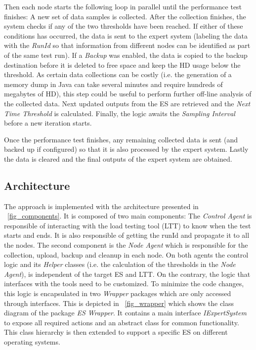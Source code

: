 \documentclass[runningheads,a4paper]{llncs}
\begin{document}

Then each node starts the following loop in parallel until the performance test
finishes: A new set of data samples is collected. After the collection finishes,
the system checks if any of the two thresholds have been reached. If either of
these conditions has occurred, the data is sent to the expert system (labeling the 
data with the \emph{RunId} so that information from different nodes can be
identified as part of the same test run). If a \emph{Backup} was enabled, the data 
is copied to the backup destination before it is deleted to free space and keep
the HD usage below the threshold. As certain data collections can be costly (i.e. 
the generation of a memory dump in Java can take several minutes and require
hundreds of megabytes of HD), this step could be useful to perform further
off-line analysis of the collected data. Next updated outputs from the ES are
retrieved and the \emph{Next Time Threshold} is calculated. Finally, the logic
awaits the \emph{Sampling Interval} before a new iteration starts.

Once the performance test finishes, any remaining collected data is sent (and
backed up if configured) so that it is also processed by the
expert system. Lastly the data is cleared and the final outputs of the expert system are obtained.

\vspace{-7pt}
\subsection{Architecture}
\vspace{-7pt}
The approach is implemented with the architecture
presented in \figurename ~\ref{fig_components}. It is composed of two main components:
The \emph{Control Agent} is responsible of interacting with the load
testing tool (LTT) to know when the test starts and ends. It is also responsible
of getting the runId and propagate it to all the nodes. The second component is
the \emph{Node Agent} which is responsible for the collection, upload, backup and cleanup in each node. 
On both agents the control logic and its \emph{Helper} classes (i.e. the
calculation of the thresholds in the \emph{Node Agent}), is independent of the target ES and LTT. On the contrary, the logic that interfaces with the tools need to be
customized. To minimize the code changes, this logic is encapsulated in two
\emph{Wrapper} packages which are only accessed through interfaces.
This is depicted in \figurename ~\ref{fig_wrapper} which shows the class diagram
of the package \emph{ES Wrapper}. It contains a main interface
\emph{IExpertSystem} to expose all required actions and an abstract
class for common functionality. This class hierarchy is then extended to
support a specific ES on different operating systems.
\end{document}
